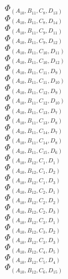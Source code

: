 \documentclass[14pt]{article}
\begin{document}
    $\Phi_{({A}_{10}, {B}_{11}, {C}_{8}, {D}_{13})}$ \\ 
    $\Phi_{({A}_{10}, {B}_{11}, {C}_{8}, {D}_{14})}$ \\ 
    $\Phi_{({A}_{10}, {B}_{11}, {C}_{9}, {D}_{11})}$ \\ 
    $\Phi_{({A}_{10}, {B}_{11}, {C}_{9}, {D}_{12})}$ \\ 
    $\Phi_{({A}_{10}, {B}_{11}, {C}_{10}, {D}_{11})}$ \\ 
    $\Phi_{({A}_{10}, {B}_{11}, {C}_{10}, {D}_{12})}$ \\ 
    $\Phi_{({A}_{10}, {B}_{11}, {C}_{11}, {D}_{9})}$ \\ 
    $\Phi_{({A}_{10}, {B}_{11}, {C}_{11}, {D}_{10})}$ \\ 
    $\Phi_{({A}_{10}, {B}_{11}, {C}_{12}, {D}_{9})}$ \\ 
    $\Phi_{({A}_{10}, {B}_{11}, {C}_{12}, {D}_{10})}$ \\ 
    $\Phi_{({A}_{10}, {B}_{11}, {C}_{13}, {D}_{7})}$ \\ 
    $\Phi_{({A}_{10}, {B}_{11}, {C}_{13}, {D}_{8})}$ \\ 
    $\Phi_{({A}_{10}, {B}_{11}, {C}_{14}, {D}_{7})}$ \\ 
    $\Phi_{({A}_{10}, {B}_{11}, {C}_{14}, {D}_{8})}$ \\ 
    $\Phi_{({A}_{10}, {B}_{11}, {C}_{15}, {D}_{6})}$ \\ 
    $\Phi_{({A}_{10}, {B}_{12}, {C}_{1}, {D}_{1})}$ \\ 
    $\Phi_{({A}_{10}, {B}_{12}, {C}_{1}, {D}_{2})}$ \\ 
    $\Phi_{({A}_{10}, {B}_{12}, {C}_{1}, {D}_{3})}$ \\ 
    $\Phi_{({A}_{10}, {B}_{12}, {C}_{2}, {D}_{1})}$ \\ 
    $\Phi_{({A}_{10}, {B}_{12}, {C}_{2}, {D}_{2})}$ \\ 
    $\Phi_{({A}_{10}, {B}_{12}, {C}_{2}, {D}_{3})}$ \\ 
    $\Phi_{({A}_{10}, {B}_{12}, {C}_{3}, {D}_{1})}$ \\ 
    $\Phi_{({A}_{10}, {B}_{12}, {C}_{3}, {D}_{2})}$ \\ 
    $\Phi_{({A}_{10}, {B}_{12}, {C}_{3}, {D}_{3})}$ \\ 
    $\Phi_{({A}_{10}, {B}_{12}, {C}_{4}, {D}_{5})}$ \\ 
    $\Phi_{({A}_{10}, {B}_{12}, {C}_{5}, {D}_{4})}$ \\ 
    $\Phi_{({A}_{10}, {B}_{12}, {C}_{6}, {D}_{15})}$ \\ 
\end{document}
